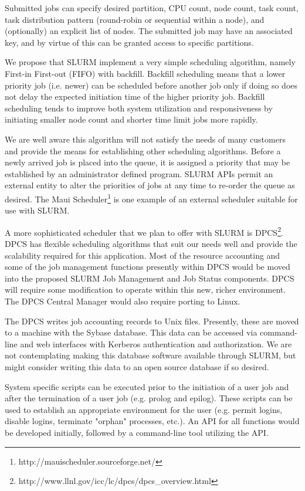Submitted jobs can specify desired partition, CPU count, node count, task 
count, task distribution pattern (round-robin or sequential within a node), 
and (optionally) an explicit list of nodes. The submitted job may have an 
associated key, and by virtue of this can be granted access to specific partitions. 

We propose that SLURM implement a very simple scheduling algorithm, 
namely First-in First-out (FIFO) with backfill. Backfill scheduling 
means that a lower priority job (i.e. newer) can be scheduled before 
another job only if doing so does not delay the expected initiation 
time of the higher priority job. Backfill scheduling tends to improve 
both system utilization and responsiveness by initiating smaller 
node count and shorter time limit jobs more rapidly. 

We are well aware this algorithm will not satisfy the needs of many 
customers and provide the means for establishing other scheduling 
algorithms. Before a newly arrived job is placed into the queue, it 
is assigned a priority that may be established by an administrator 
defined program. SLURM APIs permit an external entity to alter the 
priorities of jobs at any time to re-order the queue as desired. 
The Maui Scheduler\footnote{http://mauischeduler.sourceforge.net/} 
is one example of an external scheduler suitable for use with SLURM.

A more sophisticated scheduler that we plan to offer with SLURM is 
DPCS\footnote{http://www.llnl.gov/icc/lc/dpcs/dpcs\_overview.html}. 
DPCS has flexible scheduling algorithms that suit our needs well and
provide the scalability required for this application. Most of the resource
accounting and some of the job management functions presently within DPCS would
be moved into the proposed SLURM Job Management and Job Status components. 
DPCS will require some modification to operate within this new, richer
environment. The DPCS Central Manager would also require porting to Linux. 

The DPCS writes job accounting records to Unix files. Presently, these are
moved to a machine with the Sybase database. This data can be accessed via
command-line and web interfaces with Kerberos authentication and authorization.
We are not contemplating making this database software available through SLURM,
but might consider writing this data to an open source database if so desired.

System specific scripts can be executed prior to the initiation of a user job
and after the termination of a user job (e.g. prolog and epilog). These scripts
can be used to establish an appropriate environment for the user (e.g. permit
logins, disable logins, terminate "orphan" processes, etc.). 
An API for all functions would be developed initially, followed by a  
command-line tool utilizing the API. 

